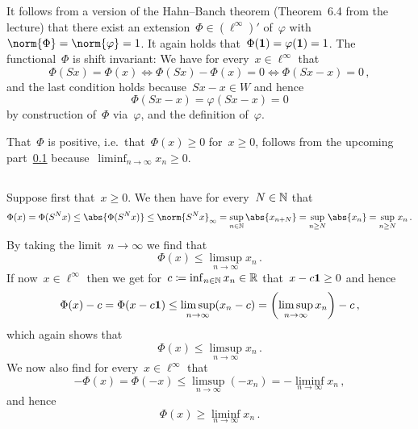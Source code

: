 It follows from a version of the Hahn--Banch theorem (Theorem~6.4 from the lecture) that there exist an extension~$\Phi \in (\ell^\infty)'$ of~$\varphi$ with~$\norm{\Phi} = \norm{\varphi} = 1$.
It again holds that~$\Phi(\mathbf{1}) = \varphi(\mathbf{1}) = 1$.
The functional~$\Phi$ is shift invariant:
We have for every~$x \in \ell^\infty$ that
\[
        \Phi(S x) = \Phi(x)
  \iff  \Phi(S x) - \Phi(x) = 0
  \iff  \Phi(S x - x) = 0 \,,
\]
and the last condition holds because~$S x - x \in W$ and hence
\[
    \Phi(S x - x)
  = \varphi(S x - x)
  = 0
\]
by construction of~$\Phi$ via~$\varphi$, and the definition of~$\varphi$.

That~$\Phi$ is positive, i.e.\ that~$\Phi(x) \geq 0$ for~$x \geq 0$, follows from the upcoming part~\ref{estimate on behavior} because~$\liminf_{n \to \infty} x_n \geq 0$.





\subsection{}
\label{estimate on behavior}


Suppose first that~$x \geq 0$.
We then have for every~$N \in \mathbb{N}$ that
\[
        \Phi(x)
  =     \Phi(S^N x)
  \leq  \abs{ \Phi(S^N x) }
  \leq  \norm{ S^N x }_{\infty}
  =     \sup_{n \in \Natural} \abs{x_{n+N}}
  =     \sup_{n \geq N} \abs{x_n}
  =     \sup_{n \geq N} x_n \,.
\]
By taking the limit~$n \to \infty$ we find that
\[
        \Phi(x)
  \leq  \limsup_{n \to \infty} x_n \,.
\]
If now~$x \in \ell^\infty$ then we get for~$c \coloneqq \inf_{n \in \mathbb{N}} x_n \in \mathbb{R}$ that~$x - c \mathbf{1} \geq 0$ and hence
\[
        \Phi(x) - c
  =     \Phi(x - c \mathbf{1})
  \leq  \limsup_{n \to \infty} (x_n - c)
  =     \left( \limsup_{n \to \infty} x_n \right) - c \,,
\]
which again shows that
\[
        \Phi(x)
  \leq  \limsup_{n \to \infty} x_n \,.
\]
We now also find for every~$x \in \ell^\infty$ that
\[
        -\Phi(x)
  =     \Phi(-x)
  \leq  \limsup_{n \to \infty} (-x_n)
  =     - \liminf_{n \to \infty} x_n \,,
\]
and hence
\[
        \Phi(x)
  \geq  \liminf_{n \to \infty} x_n \,.
\]










